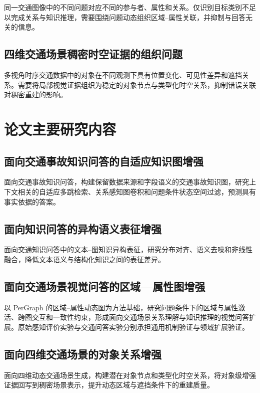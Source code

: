 同一交通图像中的不同问题对应不同的参与者、属性和关系。仅识别目标类别不足以完成关系与知识推理，需要围绕问题动态组织区域--属性关联，并抑制与回答无关的信息。

\subsection{四维交通场景稠密时空证据的组织问题}

多视角时序交通数据中的对象在不同观测下具有位置变化、可见性差异和遮挡关系。需要将局部视觉证据组织为稳定的对象节点与类型化时空关系，抑制错误关联对稠密重建的影响。

\section{论文主要研究内容}

\subsection{面向交通事故知识问答的自适应知识图增强}

面向交通事故知识问答，构建保留数据来源和字段语义的交通事故知识图，研究上下文相关的自适应多跳检索、关系感知图卷积和问题条件状态空间过滤，预测具有事实依据的答案。

\subsection{面向知识问答的异构语义表征增强}

面向交通知识问答中的文本--图知识异构表征，研究分布对齐、语义去噪和非线性融合，降低文本语义与结构化知识之间的表征差异。

\subsection{面向交通场景视觉问答的区域—属性图增强}

以 PerGraph 的区域--属性动态图为方法基础，研究问题条件下的区域与属性激活、跨图交互和一致性约束，形成面向交通场景关系理解与知识推理的视觉问答扩展。原始感知评价实验与交通问答实验分别承担通用机制验证与领域扩展验证。

\subsection{面向四维交通场景的对象关系增强}

面向四维动态交通场景生成，构建潜在对象节点和类型化时空关系，将对象级增强证据回写到稠密场景表示，提升动态区域与遮挡条件下的重建质量。

